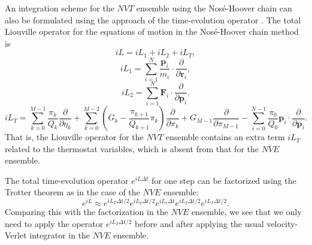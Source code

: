 \documentclass[12pt,a4paper]{report}
\newcommand{\vect}[1]{\boldsymbol{#1}}
\begin{document}
An integration scheme for the $NVT$ ensemble using the Nos\'{e}-Hoover chain can also be formulated using the approach of the time-evolution operator \cite{martyna1996mp,tuckerman2010}. The total Liouville operator for the equations of motion in the Nos\'{e}-Hoover chain method is \cite{martyna1996mp,tuckerman2010}
\begin{equation}
iL = iL_1 + iL_2 + iL_T,
\end{equation}
\begin{equation}
iL_1 = \sum_{i=1}^N
\frac{\vect{p}_i}{m_i} \cdot
\frac{\partial }{\partial \vect{r}_i},
\end{equation}
\begin{equation}
iL_2 = \sum_{i=1}^N
\vect{F}_i \cdot
\frac{\partial }{\partial \vect{p}_i}.
\end{equation}
\begin{equation}
iL_T =
\sum_{k=0}^{M-1} \frac{\pi_k}{Q_k}\frac{\partial}{\partial \eta_k} +
\sum_{k=0}^{M-2} \left(G_k - \frac{\pi_{k+1}}{Q_{k+1}}\pi_k\right)
     \frac{\partial}{\partial \pi_k}                               +
G_{M-1} \frac{\partial}{\partial \pi_{M-1}}                        -
\sum_{i=0}^{N-1}
\frac{\pi_0}{Q_0} \vect{p}_i \cdot \frac{\partial}{\partial \vect{p}_i}.
\end{equation}
That is, the Liouville operator for the $NVT$ ensemble contains an extra term $iL_T$ related to the thermostat variables, which is absent from that for the $NVE$ ensemble.

The total time-evolution operator $e^{iL\Delta t} $ for one step can be factorized using the Trotter theorem as in the case of the $NVE$ ensemble:
\begin{equation}
e^{iL} \approx
e^{iL_T\Delta t/2}
e^{iL_2\Delta t/2}
e^{iL_1\Delta t}
e^{iL_2\Delta t/2}
e^{iL_T\Delta t/2}.
\end{equation}
Comparing this with the factorization in the $NVE$ ensemble, we see that we only need to apply the operator $e^{iL_T\Delta t/2}$ before and after applying the usual velocity-Verlet integrator in the $NVE$ ensemble.
\end{document}

